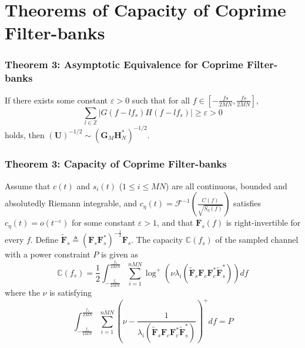 \documentclass{beamer}
\begin{document}

\section{Theorems of Capacity of Coprime Filter-banks}

\begin{frame}
\frametitle{Theorem 3: Asymptotic Equivalence for Coprime Filter-banks}
\begin{block}{}
  If there exists some constant $\varepsilon>0$ such that for all $f\in\left[-\frac{fs}{2MN}, \frac{fs}{2MN}\right]$,
  \begin{equation}
    \sum_{l\in\mathbb{Z}}|G(f-lf_s)H(f-lf_s)|\geq\varepsilon>0
  \end{equation}
  holds, then $(\pmb{U})^{-1/2}\sim(\pmb{G}_M\pmb{H}^*_N)^{-1/2}$.
\end{block}
\end{frame}

\begin{frame}
\frametitle{Theorem 3: Capacity of Coprime Filter-banks}
\begin{block}{}
  Assume that $c(t)$ and $s_i(t)$ ($1\leq i\leq MN$) are all continuous, bounded and absolutedly Riemann integrable, and $c_\eta(t)=\mathscr{F}^{-1}\left(\frac{C(f)}{\sqrt{S_\eta(f)}}\right)$ satisfies $c_\eta(t)=o(t^{-\varepsilon})$ for some constant $\varepsilon>1$, and that $\pmb{F}_s(f)$ is right-invertible for every $f$. Define $\tilde{\pmb{F}}_s\triangleq (\pmb{F}_s\pmb{F}_s^*)^{-\frac{1}{2}}\pmb{F}_s$. The capacity $\mathbb{C}(f_s)$ of the sampled channel with a power constraint $P$ is given as
  \begin{equation}
    \mathbb{C}(f_s)  =\frac{1}{2}\int_{-\frac{f_s}{2MN}}^{\frac{f_s}{2MN}}\sum_{i=1}^{nMN}\log^+\left(\nu\lambda_i\left(\tilde{\pmb{F}}_{s}\pmb{F}_{c}\pmb{F}_{c}^*\tilde{\pmb{F}}_{s}^*\right)\right)df
  \end{equation}
  where the $\nu$ is satisfying
  \begin{equation}
    \int_{-\frac{f_s}{2MN}}^{\frac{f_s}{2MN}}\sum_{i=1}^{nMN}\left(\nu - \frac{1}{\lambda_i\left(\tilde{\pmb{F}}_{s}\pmb{F}_{c}\pmb{F}_{c}^*\tilde{\pmb{F}}_{s}^*\right)}\right)^+df = P
  \end{equation}
\end{block}
\end{frame}
\end{document}
